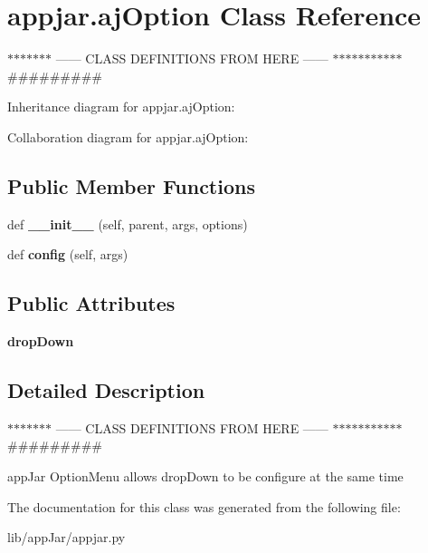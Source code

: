 \hypertarget{classappjar_1_1aj_option}{}\section{appjar.\+aj\+Option Class Reference}
\label{classappjar_1_1aj_option}


$\ast$$\ast$$\ast$$\ast$$\ast$$\ast$$\ast$ ------ C\+L\+A\+SS D\+E\+F\+I\+N\+I\+T\+I\+O\+NS F\+R\+OM H\+E\+RE ------ $\ast$$\ast$$\ast$$\ast$$\ast$$\ast$$\ast$$\ast$$\ast$$\ast$$\ast$ \#\#\#\#\#\#\#\#\#  




Inheritance diagram for appjar.\+aj\+Option\+:


Collaboration diagram for appjar.\+aj\+Option\+:
\subsection*{Public Member Functions}
\begin{DoxyCompactItemize}
\item 
\mbox{\label{classappjar_1_1aj_option_a57ca485aae7bf61fc9d2b794e7842f3b}} 
def {\bfseries \+\_\+\+\_\+init\+\_\+\+\_\+} (self, parent, args, options)
\item 
\mbox{\label{classappjar_1_1aj_option_a2f892b567cdddc5305928695f01bb2cb}} 
def {\bfseries config} (self, args)
\end{DoxyCompactItemize}
\subsection*{Public Attributes}
\begin{DoxyCompactItemize}
\item 
\mbox{\label{classappjar_1_1aj_option_a342392038107d278227ed3f656ecb6b7}} 
{\bfseries drop\+Down}
\end{DoxyCompactItemize}


\subsection{Detailed Description}
$\ast$$\ast$$\ast$$\ast$$\ast$$\ast$$\ast$ ------ C\+L\+A\+SS D\+E\+F\+I\+N\+I\+T\+I\+O\+NS F\+R\+OM H\+E\+RE ------ $\ast$$\ast$$\ast$$\ast$$\ast$$\ast$$\ast$$\ast$$\ast$$\ast$$\ast$ \#\#\#\#\#\#\#\#\# 

app\+Jar Option\+Menu allows drop\+Down to be configure at the same time 

The documentation for this class was generated from the following file\+:\begin{DoxyCompactItemize}
\item 
lib/app\+Jar/appjar.\+py\end{DoxyCompactItemize}
